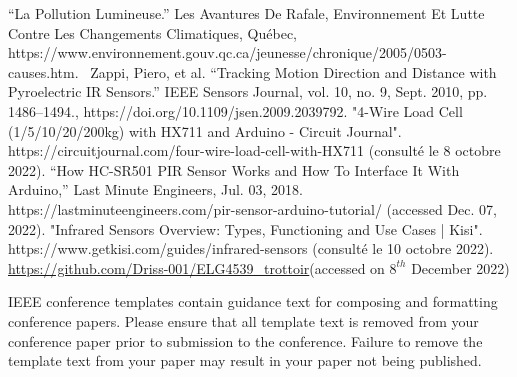 \documentclass[journal]{IEEEtran}
\begin{document}
\begin{thebibliography}{00}
 “La Pollution Lumineuse.” Les Avantures De Rafale, Environnement Et Lutte Contre Les Changements Climatiques, Québec, https://www.environnement.gouv.qc.ca/jeunesse/chronique/2005/0503-causes.htm. 
 Zappi, Piero, et al. “Tracking Motion Direction and Distance with Pyroelectric IR Sensors.” IEEE Sensors Journal, vol. 10, no. 9, Sept. 2010, pp. 1486–1494., https://doi.org/10.1109/jsen.2009.2039792.
 "4-Wire Load Cell (1/5/10/20/200kg) with HX711 and Arduino - Circuit Journal". https://circuitjournal.com/four-wire-load-cell-with-HX711 (consulté le 8 octobre 2022).
 “How HC-SR501 PIR Sensor Works and How To Interface It With Arduino,” Last Minute Engineers, Jul. 03, 2018. https://lastminuteengineers.com/pir-sensor-arduino-tutorial/ (accessed Dec. 07, 2022).
 "Infrared Sensors Overview: Types, Functioning and Use Cases | Kisi". https://www.getkisi.com/guides/infrared-sensors (consulté le 10 octobre 2022).
 {\url{https://github.com/Driss-001/ELG4539_trottoir}}(accessed on $8^{th}$ December 2022)
\end{thebibliography}
\vspace{12pt}
\color{red}
IEEE conference templates contain guidance text for composing and formatting conference papers. Please ensure that all template text is removed from your conference paper prior to submission to the conference. Failure to remove the template text from your paper may result in your paper not being published.
\end{document}
